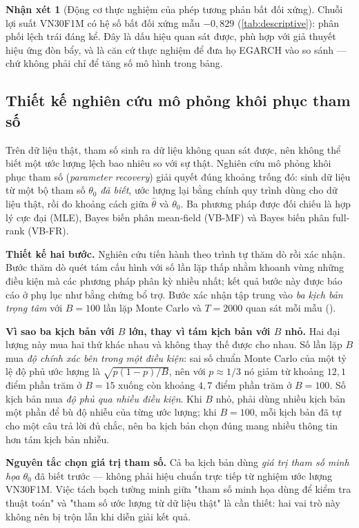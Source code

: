 \documentclass[12pt,a4paper]{article}
\numberwithin{equation}{section}
\theoremstyle{definition}
\newtheorem{remark}{Nhận xét}[section]
\begin{document}
	\begin{remark}[Động cơ thực nghiệm của phép tương phản bất đối xứng]\label{rem:leverage-motivation}
		Chuỗi lợi suất VN30F1M có hệ số bất đối xứng mẫu $-0{,}829$ (\cref{tab:descriptive}):
		phân phối lệch trái đáng kể. Đây là dấu hiệu quan sát được, phù hợp với giả thuyết
		hiệu ứng đòn bẩy, và là căn cứ thực nghiệm để đưa họ EGARCH vào so sánh --- chứ không
		phải chỉ để tăng số mô hình trong bảng.
	\end{remark}

	\subsection{Thiết kế nghiên cứu mô phỏng khôi phục tham số}\label{subsec:simulation-design}
	Trên dữ liệu thật, tham số sinh ra dữ liệu không quan sát được, nên không thể biết một
	ước lượng lệch bao nhiêu so với sự thật. Nghiên cứu mô phỏng khôi phục tham số
	(\emph{parameter recovery}) giải quyết đúng khoảng trống đó: sinh dữ liệu từ một bộ tham
	số $\theta_0$ \emph{đã biết}, ước lượng lại bằng chính quy trình dùng cho dữ liệu thật,
	rồi đo khoảng cách giữa $\hat\theta$ và $\theta_0$. Ba phương pháp được đối chiếu là hợp
	lý cực đại (MLE), Bayes biến phân mean-field (VB-MF) và Bayes biến phân full-rank (VB-FR).

	\textbf{Thiết kế hai bước.} Nghiên cứu tiến hành theo trình tự thăm dò rồi xác nhận.
	Bước thăm dò quét tám cấu hình với số lần lặp thấp nhằm khoanh vùng những điều kiện mà
	các phương pháp phân kỳ nhiều nhất; kết quả bước này được báo cáo ở phụ lục như bằng
	chứng bổ trợ. Bước xác nhận tập trung vào \emph{ba kịch bản trọng tâm} với $B=100$ lần
	lặp Monte Carlo và $T=2000$ quan sát mỗi mẫu ().

	\textbf{Vì sao ba kịch bản với $B$ lớn, thay vì tám kịch bản với $B$ nhỏ.} Hai đại lượng
	này mua hai thứ khác nhau và không thay thế được cho nhau. Số lần lặp $B$ mua \emph{độ
	chính xác bên trong một điều kiện}: sai số chuẩn Monte Carlo của một tỷ lệ độ phủ ước
	lượng là $\sqrt{p(1-p)/B}$, nên với $p\approx 1/3$ nó giảm từ khoảng $12{,}1$ điểm phần
	trăm ở $B=15$ xuống còn khoảng $4{,}7$ điểm phần trăm ở $B=100$. Số kịch bản mua \emph{độ
	phủ qua nhiều điều kiện}. Khi $B$ nhỏ, phải dùng nhiều kịch bản một phần để bù độ nhiễu
	của từng ước lượng; khi $B=100$, mỗi kịch bản đã tự cho một câu trả lời đủ chắc, nên ba
	kịch bản chọn đúng mang nhiều thông tin hơn tám kịch bản nhiễu.

	\textbf{Nguyên tắc chọn giá trị tham số.} Cả ba kịch bản dùng \emph{giá trị tham số minh
	họa} $\theta_0$ đã biết trước --- không phải hiệu chuẩn trực tiếp từ nghiệm ước lượng
	VN30F1M. Việc tách bạch tường minh giữa "tham số minh họa dùng để kiểm tra thuật toán" và
	"tham số ước lượng từ dữ liệu thật" là cần thiết: hai vai trò này không nên bị trộn lẫn
	khi diễn giải kết quả.
\end{document}
